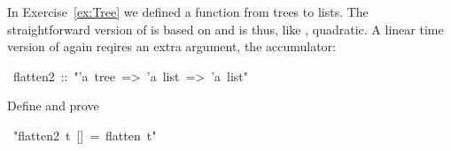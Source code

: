\begin{isabelle}%
%
\begin{isamarkuptext}%
\noindent In Exercise~\ref{ex:Tree} we defined a function
 from trees to lists. The straightforward version of
 is based on \isa{\at} and is thus, like , quadratic.
A linear time version of  again reqires an extra
argument, the accumulator:%
\end{isamarkuptext}%
\ flatten2\ ::\ {"}'a\ tree\ =>\ 'a\ list\ =>\ 'a\ list{"}%
\begin{isamarkuptext}%
\noindent Define  and prove%
\end{isamarkuptext}%
\ {"}flatten2\ t\ []\ =\ flatten\ t{"}\end{isabelle}%
